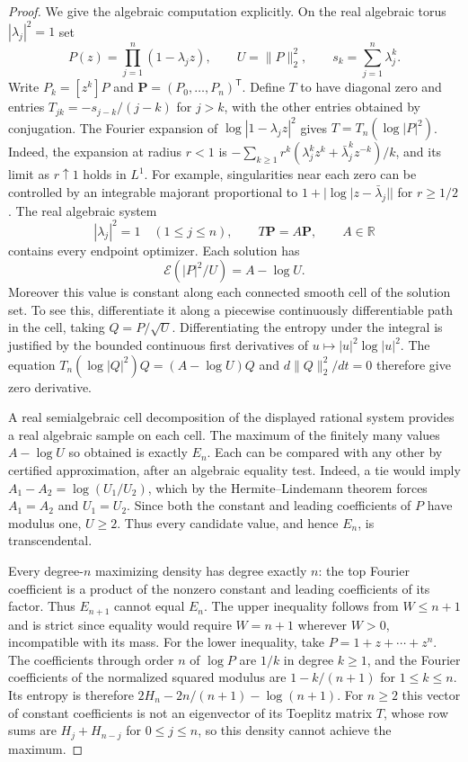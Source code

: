\documentclass[11pt]{article}
\begin{document}
\begin{proof}
We give the algebraic computation explicitly. On the real
algebraic torus \(|\lambda_j|^2=1\) set
\[
 P(z)=\prod_{j=1}^n(1-\lambda_jz),\qquad U=\|P\|_2^2,
 \qquad s_k=\sum_{j=1}^n\lambda_j^k .
\]
Write \(P_k=[z^k]P\) and \(\mathbf P=(P_0,\ldots,P_n)^\mathsf T\).
Define \(T\) to have diagonal zero and entries \(T_{jk}=-s_{j-k}/(j-k)\)
for \(j>k\), with the other entries obtained by conjugation. The
Fourier expansion of \(\log |1-\lambda_j z|^2\) gives
\(T=T_n(\log |P|^2)\). Indeed, the expansion at radius \(r<1\)
is \(-\sum_{k\geq1}r^k(\lambda_j^k z^k+
\bar\lambda_j^k z^{-k})/k\), and its limit as \(r\uparrow1\)
holds in \(L^1\). For example, singularities near each zero can
be controlled by an integrable majorant proportional to
\(1+|\log|z-\bar\lambda_j||\) for \(r\geq1/2\).
The real algebraic system
\[
 |\lambda_j|^2=1\quad (1\leq j\leq n),\qquad
 T\mathbf P=A\mathbf P,\qquad A\in\mathbb R
\]
contains every endpoint optimizer. Each solution has
\[
 \mathcal E(|P|^2/U)=A-\log U .
\]
Moreover this value is constant along each connected smooth
cell of the solution set. To see this, differentiate it along
a piecewise continuously differentiable path in the cell, taking
\(Q=P/\sqrt U\). Differentiating the entropy under the integral
is justified by the bounded continuous first derivatives of
\(u\mapsto |u|^2\log|u|^2\). The equation
\(T_n(\log|Q|^2)Q=(A-\log U)Q\) and
\(d\|Q\|_2^2/dt=0\) therefore give zero derivative.

A real semialgebraic cell decomposition of the displayed
rational system provides a real algebraic sample on each cell.
The maximum of the finitely many values \(A-\log U\) so obtained
is exactly \(E_n\). Each can be compared with any other by
certified approximation, after an algebraic equality test.
Indeed, a tie would imply
\(A_1-A_2=\log(U_1/U_2)\), which by the Hermite--Lindemann
theorem forces \(A_1=A_2\) and \(U_1=U_2\). Since both
the constant and leading coefficients of \(P\) have modulus
one, \(U\geq2\). Thus every candidate value, and hence \(E_n\),
is transcendental.

Every degree-\(n\) maximizing density has degree exactly \(n\):
the top Fourier coefficient is a product of the nonzero constant
and leading coefficients of its factor. Thus \(E_{n+1}\) cannot
equal \(E_n\). The upper inequality follows from \(W\leq n+1\)
and is strict since equality would require \(W=n+1\) wherever
\(W>0\), incompatible with its mass. For the lower inequality,
take \(P=1+z+\cdots+z^n\). The coefficients through order \(n\)
of \(\log P\) are \(1/k\) in degree \(k\geq1\), and the
Fourier coefficients of the normalized squared modulus are
\(1-k/(n+1)\) for \(1\leq k\leq n\). Its entropy is therefore
\(2H_n-2n/(n+1)-\log(n+1)\).
For \(n\geq2\) this vector of constant coefficients is not
an eigenvector of its Toeplitz matrix \(T\), whose row sums
are \(H_j+H_{n-j}\) for \(0\leq j\leq n\), so this density
cannot achieve the maximum.
\end{proof}
\end{document}
